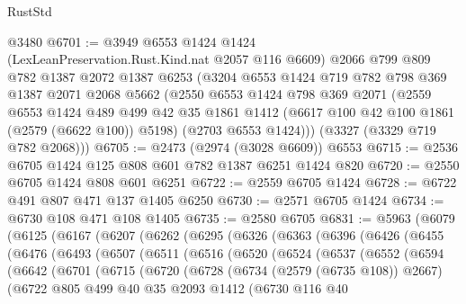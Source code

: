 \begin{lexlean}{RustStd}
\begin{coremodule}
{\begin{coremodule}
{{{{{{{{{{    @3480
@6701 := @3949
    @6553
    @1424
    @1424
    (LexLeanPreservation.Rust.Kind.nat @2057 @116 @6609)
    @2066
    @799
    @809
    @782
    @1387
    @2072
    @1387
    @6253
    (@3204
      @6553
      @1424
      @719
      @782
      @798
      @369
      @1387
      @2071
      @2068
      @5662
      (@2550
        @6553
        @1424
        @798
        @369
        @2071
        (@2559
          @6553
          @1424
          @489
          @499
          @42
          @35
          @1861
          @1412
          (@6617 @100 @42 @100 @1861 (@2579 (@6622 @100)) @5198)
          (@2703 @6553 @1424)))
      (@3327 (@3329 @719 @782 @2068)))
@6705 := @2473 (@2974 (@3028 @6609)) @6553
@6715 := @2536 @6705 @1424 @125 @808 @601 @782 @1387 @6251 @1424 @820
@6720 := @2550 @6705 @1424 @808 @601 @6251
@6722 := @2559 @6705 @1424
@6728 := @6722 @491 @807 @471 @137 @1405 @6250
@6730 := @2571 @6705 @1424
@6734 := @6730 @108 @471 @108 @1405
@6735 := @2580 @6705
@6831 := @5963
    (@6079
      (@6125
        (@6167
          (@6207
            (@6262
              (@6295
                (@6326
                  (@6363
                    (@6396
                      (@6426
                        (@6455
                          (@6476
                            (@6493
                              (@6507
                                (@6511
                                  (@6516
                                    (@6520
                                      (@6524
                                        (@6537
                                          (@6552
                                            (@6594
                                              (@6642
                                                (@6701
                                                  (@6715
                                                    (@6720
                                                      (@6728
                                                        (@6734 (@2579 (@6735 @108)) @2667)
                                                        (@6722
                                                          @805
                                                          @499
                                                          @40
                                                          @35
                                                          @2093
                                                          @1412
                                                          (@6730
                                                            @116
                                                            @40
}}}}}}}}}}
\end{coremodule}}
\end{coremodule}
\end{lexlean}
